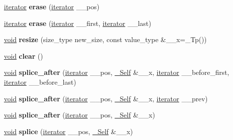 \begin{DoxyCompactItemize}
\mbox{\label{classslist_a35dbce9c988530781c80307368e317ae}} 
\hyperlink{structiterator}{iterator} {\bfseries erase} (\hyperlink{structiterator}{iterator} \+\_\+\+\_\+pos)
\item 
\mbox{\label{classslist_a4dd3ecbe29ec0a3e84a75d08718aca4b}} 
\hyperlink{structiterator}{iterator} {\bfseries erase} (\hyperlink{structiterator}{iterator} \+\_\+\+\_\+first, \hyperlink{structiterator}{iterator} \+\_\+\+\_\+last)
\item 
\mbox{\label{classslist_a127c10117256fe85f22231352dd02d79}} 
\hyperlink{interfacevoid}{void} {\bfseries resize} (size\+\_\+type new\+\_\+size, const value\+\_\+type \&\+\_\+\+\_\+x=\+\_\+\+Tp())
\item 
\mbox{\label{classslist_a4cab9db69ad3099ef5756eff0df92b6b}} 
\hyperlink{interfacevoid}{void} {\bfseries clear} ()
\item 
\mbox{\label{classslist_a43fff629ab49046d05b0460180c58dd8}} 
\hyperlink{interfacevoid}{void} {\bfseries splice\+\_\+after} (\hyperlink{structiterator}{iterator} \+\_\+\+\_\+pos, \hyperlink{classslist}{\+\_\+\+Self} \&\+\_\+\+\_\+x, \hyperlink{structiterator}{iterator} \+\_\+\+\_\+before\+\_\+first, \hyperlink{structiterator}{iterator} \+\_\+\+\_\+before\+\_\+last)
\item 
\mbox{\label{classslist_af0e0516c57a7c82210ef9e928e498e95}} 
\hyperlink{interfacevoid}{void} {\bfseries splice\+\_\+after} (\hyperlink{structiterator}{iterator} \+\_\+\+\_\+pos, \hyperlink{classslist}{\+\_\+\+Self} \&\+\_\+\+\_\+x, \hyperlink{structiterator}{iterator} \+\_\+\+\_\+prev)
\item 
\mbox{\label{classslist_ab7aa6a6a336da3138b52e05bc16a1d7e}} 
\hyperlink{interfacevoid}{void} {\bfseries splice\+\_\+after} (\hyperlink{structiterator}{iterator} \+\_\+\+\_\+pos, \hyperlink{classslist}{\+\_\+\+Self} \&\+\_\+\+\_\+x)
\item 
\mbox{\label{classslist_accfb0bcfcb3b7d66ac77836627d20227}} 
\hyperlink{interfacevoid}{void} {\bfseries splice} (\hyperlink{structiterator}{iterator} \+\_\+\+\_\+pos, \hyperlink{classslist}{\+\_\+\+Self} \&\+\_\+\+\_\+x)

\end{DoxyCompactItemize}

